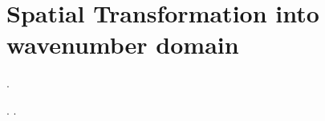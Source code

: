 \documentclass[../Dissertation]{subfiles}
\begin{document}
\section{Spatial Transformation into wavenumber domain}
    \lipsum[64] \cite{Mitry_2010} \lipsum[64] \cite{Rosner_1987, Fivgas_2001}.
    
    \lipsum[64]
    
    \lipsum[64] \cite{Sebag_1991} \lipsum[64] \cite{Sebag_1992,
    Fivgas_2001, Gandorfer_2001, Gandorfer_2002, Bishop_2004, Ponsioen_2008,
    Mitry_2010}.  \lipsum[64] \cite{Balazs_1982, Bishop_2004}.  \lipsum[64]
    
    \lipsum[64] \cite{Gandorfer_2001} \lipsum[64]
    
    \lipsum[64] \cite{Zauberman_1969, Zauberman_1972_Biophysical,
    Zauberman_1972_Measurement, deguillebon_1971, 
    deGuillebon_1972_Experimental} \lipsum[64] \cite{Zauberman_1969}
    
    \lipsum[64]  \cite{Endo_1988} \lipsum[64]
    
    \lipsum[64] \cite{Kita_1990} \lipsum[64] \cite{Marmor_1980} \lipsum[64]
    
    \lipsum[64]
\end{document}
